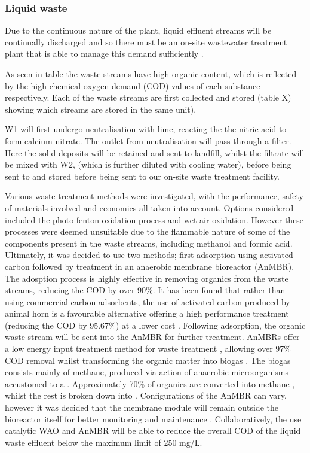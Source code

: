 \subsubsection{Liquid waste }

Due to the continuous nature of the plant, liquid effluent streams will be continually discharged and so there must be an on-site wastewater treatment plant that is able to manage this demand sufficiently \cite{water_innovations_inc_continuous_2021}.  

As seen in table %
the waste streams have high organic content, which is reflected by the high chemical oxygen demand (COD) values of each substance respectively. Each of the waste streams are first collected and stored (table X) showing which streams are stored in the same unit). 

W1 will first undergo neutralisation with lime, reacting the the nitric acid to form calcium nitrate. The outlet from neutralisation will pass through a filter. Here the solid deposits will be retained and sent to landfill, whilst the filtrate will be mixed with W2, (which is further diluted with cooling water), before being sent to and stored before being sent to our on-site waste treatment facility. 

Various waste treatment methods were investigated, with the performance,  safety of materials involved and economics all taken into account. Options considered included the photo-fenton-oxidation process and wet air oxidation. However these processes were deemed unsuitable due to the flammable nature of some of the components present in the waste streams, including methanol and formic acid. Ultimately, it was decided to use two methods; first adsorption using activated carbon followed by treatment in an anaerobic membrane bioreactor (AnMBR). The adosption process is highly effective in removing organics from the waste streams, reducing the COD by over 90\%. It has been found that rather than using commercial carbon adsorbents, the use of activated carbon produced by animal horn is a favourable alternative offering a high performance treatment (reducing the COD by 95.67\%) at a lower cost \cite{aluyor_cod_2008}. Following adsorption, the organic waste stream will be sent into the AnMBR for further treatment. AnMBRs offer a low energy input treatment method for waste treatment \cite{maaz_anaerobic_2019}, allowing over 97\% COD removal whilst transforming the organic matter into biogas \cite{ariunbaatar_performance_2021}. The biogas consists mainly of methane, produced via action of anaerobic microorganisms accustomed to a  . Approximately 70\% of organics are converted into methane \cite{ariunbaatar_performance_2021}, whilst the rest is broken down into . Configurations of the AnMBR can vary, however it was decided that the membrane module will remain outside the bioreactor itself for better monitoring and maintenance \cite{maaz_anaerobic_2019}. Collaboratively, the use catalytic WAO and AnMBR will be able to reduce the overall COD of the liquid waste effluent below the maximum limit of 250 mg/L. 

